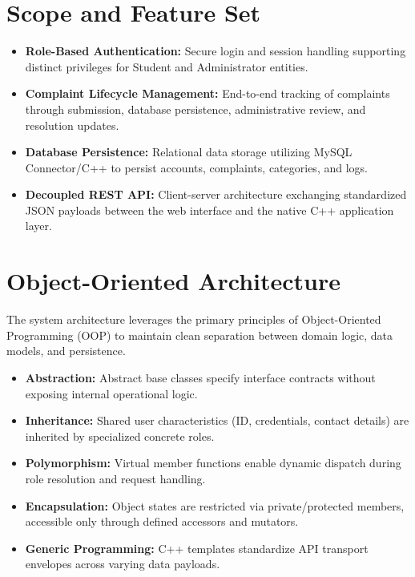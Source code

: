 \documentclass[12pt,a4paper,oneside]{book}
\begin{document}
\section{Scope and Feature Set}
\begin{itemize}
    \item \textbf{Role-Based Authentication:} Secure login and session handling supporting distinct privileges for Student and Administrator entities.
    \item \textbf{Complaint Lifecycle Management:} End-to-end tracking of complaints through submission, database persistence, administrative review, and resolution updates.
    \item \textbf{Database Persistence:} Relational data storage utilizing MySQL Connector/C++ to persist accounts, complaints, categories, and logs.
    \item \textbf{Decoupled REST API:} Client-server architecture exchanging standardized JSON payloads between the web interface and the native C++ application layer.
\end{itemize}

\section{Object-Oriented Architecture}
The system architecture leverages the primary principles of Object-Oriented Programming (OOP) to maintain clean separation between domain logic, data models, and persistence.

\begin{itemize}
    \item \textbf{Abstraction:} Abstract base classes specify interface contracts without exposing internal operational logic.
    \item \textbf{Inheritance:} Shared user characteristics (ID, credentials, contact details) are inherited by specialized concrete roles.
    \item \textbf{Polymorphism:} Virtual member functions enable dynamic dispatch during role resolution and request handling.
    \item \textbf{Encapsulation:} Object states are restricted via private/protected members, accessible only through defined accessors and mutators.
    \item \textbf{Generic Programming:} C++ templates standardize API transport envelopes across varying data payloads.
\end{itemize}
\end{document}
